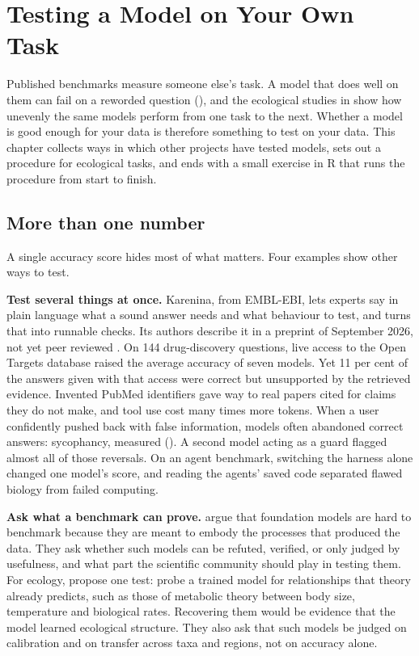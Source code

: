\chapter{Testing a Model on Your Own Task}
\label{ch:testing}

Published benchmarks measure someone else's task. A model that does well on
them can fail on a reworded question (), and the ecological
studies in  show how unevenly the same models perform
from one task to the next. Whether a model is good enough for your data is
therefore something to test on your data. This chapter collects ways in which
other projects have tested models, sets out a procedure for ecological tasks,
and ends with a small exercise in R that runs the procedure from start to
finish.

\section{More than one number}

A single accuracy score hides most of what matters. Four examples show other
ways to test.

\textbf{Test several things at once.} Karenina, from EMBL-EBI, lets experts
say in plain language what a sound answer needs and what behaviour to test,
and turns that into runnable checks. Its authors describe it in a preprint of
September 2026, not yet peer reviewed \parencite{carli2026karenina}. On 144
drug-discovery questions, live access to the Open Targets database raised the
average accuracy of seven models. Yet 11 per cent of the answers given with
that access were correct but unsupported by the retrieved evidence. Invented PubMed
identifiers gave way to real papers cited for claims they do not make, and
tool use cost many times more tokens. When a user confidently pushed back with
false information, models often abandoned correct answers: sycophancy,
measured (). A second model acting as a guard flagged almost
all of those reversals. On an agent benchmark, switching the harness alone
changed one model's score, and reading the agents' saved code separated flawed
biology from failed computing.

\textbf{Ask what a benchmark can prove.} \textcite{saezrodriguez2026benchmarking}
argue that foundation models are hard to benchmark because they are meant to
embody the processes that produced the data. They ask whether such models can be
refuted, verified, or only judged by usefulness, and what part the scientific
community should play in testing them. For ecology,
\textcite{gardiner2026foundation} propose one test: probe a trained model for
relationships that theory already predicts, such as those of metabolic theory
between body size, temperature and biological rates. Recovering them would be
evidence that the model learned ecological structure. They also ask that such
models be judged on calibration and on transfer across taxa and regions, not
on accuracy alone.

